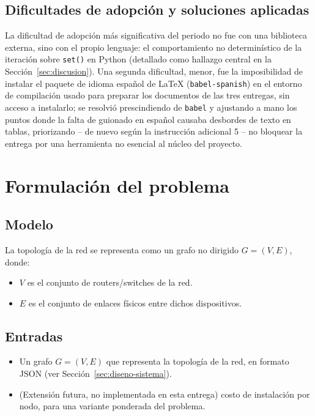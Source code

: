 \documentclass[11pt,a4paper]{article}
\begin{document}
\subsection{Dificultades de adopción y soluciones aplicadas}
La dificultad de adopción más significativa del periodo no fue con una biblioteca externa,
sino con el propio lenguaje: el comportamiento no determinístico de la iteración sobre
\texttt{set()} en Python (detallado como hallazgo central en la Sección~\ref{sec:discusion}).
Una segunda dificultad, menor, fue la imposibilidad de instalar el paquete de idioma
español de \LaTeX{} (\texttt{babel-spanish}) en el entorno de compilación usado para
preparar los documentos de las tres entregas, sin acceso a instalarlo; se resolvió
prescindiendo de \texttt{babel} y ajustando a mano los puntos donde la falta de guionado en
español causaba desbordes de texto en tablas, priorizando -- de nuevo según la instrucción
adicional 5 -- no bloquear la entrega por una herramienta no esencial al núcleo del
proyecto.

\section{Formulación del problema}
\label{sec:formulacion}

\subsection{Modelo}
La topología de la red se representa como un grafo no dirigido $G = (V, E)$, donde:
\begin{itemize}
	\item $V$ es el conjunto de routers/switches de la red.
	\item $E$ es el conjunto de enlaces físicos entre dichos dispositivos.
\end{itemize}

\subsection{Entradas}
\begin{itemize}
	\item Un grafo $G = (V, E)$ que representa la topología de la red, en formato JSON
	(ver Sección~\ref{sec:diseno-sistema}).
	\item (Extensión futura, no implementada en esta entrega) costo de instalación por nodo,
	para una variante ponderada del problema.
\end{itemize}
\end{document}

